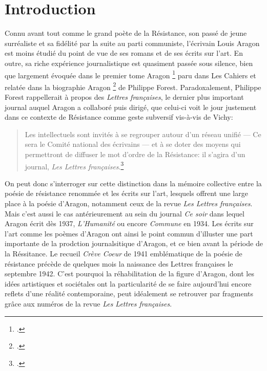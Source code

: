 \chapter*{Introduction} 

Connu avant tout comme le grand poète de la Résistance, son passé de jeune surréaliste et sa fidélité par la suite au parti communiste, l'écrivain Louis Aragon est moins étudié du point de vue de ses romans et de ses écrits sur l'art. En outre, sa riche expérience journalistique est quasiment passée sous silence, bien que largement évoquée dans le premier tome Aragon \footcite[]{cahiers} paru dans Les Cahiers et relatée dans la biographie Aragon \footcite[]{biographie}  de Philippe Forest. Paradoxalement, Philippe Forest rappellerait à propos des \emph{Lettres françaises}, le dernier plus important journal auquel Aragon a collaboré puis dirigé, que celui-ci voit le jour justement dans ce contexte de Résistance comme geste subversif vis-à-vis de Vichy:
\begin{quote} 
Les intellectuels sont invités à se regrouper autour d'un réseau unifié --- Ce sera le Comité national des écrivains --- et à se doter des moyens qui permettront de diffuser le mot d'ordre de la Résistance: il s'agira d'un journal, \emph{Les Lettres françaises}.\footcite[]{biographie}
\end{quote}
On peut donc s'interroger sur cette distinction dans la mémoire collective entre la poésie de résistance renommée et les écrits sur l'art, lesquels offrent une large place à la poésie d'Aragon, notamment ceux de la revue \emph{Les Lettres françaises}. Mais c'est aussi le cas antérieurement au sein du journal \emph{Ce soir} dans lequel Aragon écrit dès 1937, \emph{L'Humanité} ou encore \emph{Commune} en 1934. Les écrits sur l'art comme les poèmes d'Aragon ont ainsi le point commun d'illuster une part importante de la prodction journalsitique d'Aragon, et ce bien avant la période de la Réssitance. Le recueil \emph{Crève Coeur }de 1941 emblématique de la poésie de résistance précède de quelques mois la naissance des Lettres françaises le septembre 1942. C'est pourquoi la réhabilitation de la figure d'Aragon, dont les idées artistiques et sociétales ont la particularité de se faire aujourd'hui encore reflets d'une réalité contemporaine, peut idéalement se retrouver par fragments grâce aux numéros de la revue \emph{Les Lettres françaises}.


